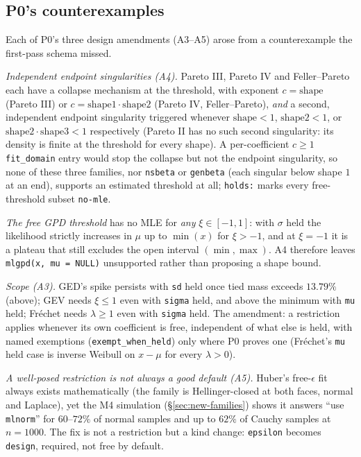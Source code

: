 \documentclass[11pt]{article}
\newcommand{\code}[1]{\texttt{#1}}
\theoremstyle{plain}
\theoremstyle{definition}
\theoremstyle{remark}
\begin{document}
\subsection*{P0's counterexamples}

Each of P0's three design amendments (A3--A5) arose from a counterexample
the first-pass schema missed.

\emph{Independent endpoint singularities (A4).} Pareto III, Pareto IV and
Feller--Pareto each have a collapse mechanism at the threshold, with
exponent $c=\mathrm{shape}$ (Pareto III) or
$c=\mathrm{shape1}\cdot\mathrm{shape2}$ (Pareto IV, Feller--Pareto),
\emph{and} a second, independent endpoint singularity triggered whenever
$\mathrm{shape}<1$, $\mathrm{shape2}<1$, or
$\mathrm{shape2}\cdot\mathrm{shape3}<1$ respectively (Pareto II has no such
second singularity: its density is finite at the threshold for every
shape). A per-coefficient $c\ge1$ \code{fit\_domain} entry would stop the
collapse but not the endpoint singularity, so none of these three families,
nor \code{nsbeta} or \code{genbeta} (each singular below shape $1$ at an
end), supports an estimated threshold at all; \code{holds:} marks every
free-threshold subset \code{no-mle}.

\emph{The free GPD threshold} has no MLE for \emph{any} $\xi\in[-1,1]$:
with $\sigma$ held the likelihood strictly increases in $\mu$ up to
$\min(x)$ for $\xi>-1$, and at $\xi=-1$ it is a plateau that still excludes
the open interval $(\min,\max)$. A4 therefore leaves
\code{mlgpd(x, mu = NULL)} unsupported rather than proposing a shape bound.

\emph{Scope (A3).} GED's spike persists with \code{sd} held once tied mass
exceeds $13.79\%$ (above); GEV needs $\xi\le1$ even with \code{sigma} held,
and above the minimum with \code{mu} held; Fr\'echet needs $\lambda\ge1$
even with \code{sigma} held. The amendment: a restriction applies whenever
its own coefficient is free, independent of what else is held, with named
exemptions (\code{exempt\_when\_held}) only where P0 proves one (Fr\'echet's
\code{mu} held case is inverse Weibull on $x-\mu$ for every $\lambda>0$).

\emph{A well-posed restriction is not always a good default (A5).} Huber's
free-$\epsilon$ fit always exists mathematically (the family is
Hellinger-closed at both faces, normal and Laplace), yet the M4 simulation
(\S\ref{sec:new-families}) shows it answers ``use \code{mlnorm}'' for
$60$--$72\%$ of normal samples and up to $62\%$ of Cauchy samples at
$n=1000$. The fix is not a restriction but a kind change: \code{epsilon}
becomes \code{design}, required, not free by default.
\end{document}
